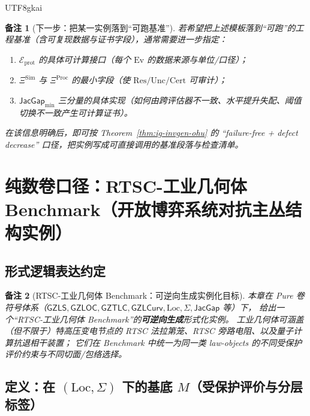 \documentclass[12pt]{article}
\newtheorem{remark}{备注}[section]
\newcommand{\GZLS}{\ensuremath{\mathsf{GZLS}}}
\newcommand{\GZLOC}{\ensuremath{\mathsf{GZLOC}}}
\newcommand{\GZLCurv}{\ensuremath{\mathsf{GZLCurv}}}
\newcommand{\GZTLC}{\ensuremath{\mathsf{GZTLC}}}
\newcommand{\JacGap}{\ensuremath{\mathsf{JacGap}}}
\newcommand{\RTSC}{\textsf{RTSC}}
\begin{document}
\begin{CJK*}{UTF8}{gkai}
\begin{remark}[下一步：把某一实例落到“可跑基准”]
若希望把上述模板落到“可跑”的工程基准（含可复现数据与证书字段），通常需要进一步指定：
\begin{enumerate}
  \item $\mathcal{E}_{\mathrm{prot}}$ 的具体可计算接口（每个 $\mathrm{Ev}$ 的数据来源与单位/口径）；
  \item $\Xi^{\mathrm{Sim}}$ 与 $\Xi^{\mathrm{Proc}}$ 的最小字段（使 $\mathrm{Res}/\mathrm{Unc}/\mathrm{Cert}$ 可审计）；
  \item $\JacGap_{\min}$ 三分量的具体实现（如何由跨评估器不一致、水平提升失配、阈值切换不一致产生可计算证书）。
\end{enumerate}
在该信息明确后，即可按 Theorem~\ref{thm:ig-invgen-ohu} 的 “failure-free + defect decrease” 口径，把实例写成可直接调用的基准段落与检查清单。
\end{remark}

\clearpage
\section{纯数卷口径：\RTSC{}-工业几何体 Benchmark（开放博弈系统对抗主丛结构实例）}
\label{sec:puremath-rtsc-industrial-geometry-benchmark}

\subsection{形式逻辑表达约定}

\begin{remark}[\RTSC{}-工业几何体 Benchmark：可逆向生成实例化目标]
本章在 Pure 卷符号体系（$\GZLS,\GZLOC,\GZTLC,\GZLCurv,\mathrm{Loc},\Sigma,\JacGap$ 等）下，
给出一个“\RTSC{}-工业几何体 Benchmark”的\textbf{可逆向生成}形式化实例。
工业几何体可涵盖（但不限于）特高压变电节点的 \RTSC{} 法拉第笼、\RTSC{} 旁路电阻、以及量子计算抗退相干装置；
它们在 Benchmark 中统一为同一类 law-objects 的不同受保护评价约束与不同切面/包络选择。
\end{remark}

\subsection{定义：在 $(\mathrm{Loc},\Sigma)$ 下的基底 $M$（受保护评价与分层标签）}


\end{CJK*}
\end{document}
